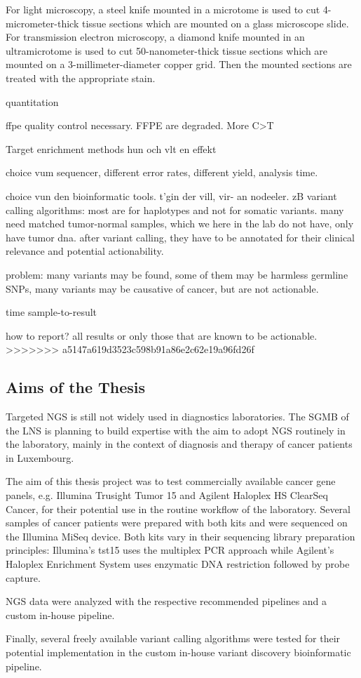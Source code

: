 For light microscopy, a steel knife mounted in a microtome is used to cut
4-micrometer-thick tissue sections which are mounted on a glass microscope
slide. For transmission electron microscopy, a diamond knife mounted in an
ultramicrotome is used to cut 50-nanometer-thick tissue sections which are
mounted on a 3-millimeter-diameter copper grid. Then the mounted sections are
treated with the appropriate stain.

quantitation

ffpe quality control necessary. FFPE are degraded. More C>T

Target enrichment methods hun och vlt en effekt

choice vum sequencer, different error rates, different yield, analysis time.

choice vun den bioinformatic tools. t'gin der vill, vir- an nodeeler. zB variant
calling algorithms: most are for haplotypes and not for somatic variants. many
need matched tumor-normal samples, which we here in the lab do not have, only have
tumor dna. after variant calling, they have to be annotated for their clinical
relevance and potential actionability.

problem: many variants may be found, some of them may be
harmless germline SNPs, many variants may be causative of cancer, but are not actionable.

time sample-to-result

how to report? all results or only those that are known to be actionable.
>>>>>>> a5147a619d3523c598b91a86e2c62e19a96fd26f

\subsection{Aims of the Thesis}
Targeted NGS is still not widely used in diagnostics laboratories. The SGMB of the LNS
is planning to build expertise with the aim to adopt NGS routinely in the laboratory,
mainly in the context of diagnosis and therapy of cancer patients in Luxembourg.

The aim of this thesis project was to test commercially available cancer gene panels,
e.g. Illumina Trusight Tumor 15 and Agilent Haloplex HS ClearSeq Cancer, for their
potential use in the routine workflow of the laboratory. Several samples of cancer
patients were prepared with both kits and were sequenced on the Illumina MiSeq device.
Both kits vary in their sequencing library preparation principles: Illumina's tst15
uses the multiplex PCR approach while Agilent's Haloplex Enrichment System uses
enzymatic DNA restriction followed by probe capture.

NGS data were analyzed with the respective recommended pipelines and a custom in-house
pipeline.

Finally, several freely available variant calling algorithms were tested for their
potential implementation in the custom in-house variant discovery bioinformatic
pipeline.
